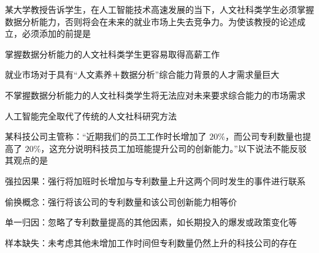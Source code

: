 \documentclass{exam-zh}
\begin{document}
\begin{question}
某大学教授告诉学生，在人工智能技术高速发展的当下，人文社科类学生必须掌握数据分析能力，否则将会在未来的就业市场上失去竞争力。为使该教授的论述成立，必须添加的前提是 \paren[]
\begin{choices}
  \item 掌握数据分析能力的人文社科类学生更容易取得高薪工作
  \item 就业市场对于具有“人文素养＋数据分析”综合能力背景的人才需求量巨大
  \item 不掌握数据分析能力的人文社科类学生将无法应对未来要求综合能力的市场需求
  \item 人工智能完全取代了传统的人文社科研究方法
\end{choices}
\end{question}

\begin{question}
某科技公司主管称：“近期我们的员工工作时长增加了 $20\%$，而公司专利数量也提高了 $20\%$，这充分说明科技员工加班能提升公司的创新能力。”以下说法不能反驳其观点的是 \paren[]
\begin{choices}
  \item 强拉因果：强行将加班时长增加与专利数量上升这两个同时发生的事件进行联系
  \item 偷换概念：强行将该公司的专利数量和该公司创新能力相等价
  \item 单一归因：忽略了专利数量提高的其他因素，如长期投入的爆发或政策变化等
  \item 样本缺失：未考虑其他未增加工作时间但专利数量仍然上升的科技公司的存在
\end{choices}
\end{question}
\end{document}
